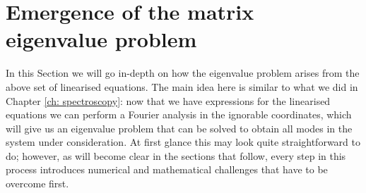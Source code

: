 \section{Emergence of the matrix eigenvalue problem} \label{sec: eigenvalue problem}
In this Section we will go in-depth on how the eigenvalue problem arises from the above set of linearised equations.
The main idea here is similar to what we did in Chapter \ref{ch: spectroscopy}: now that we have expressions for the linearised equations we can perform a Fourier analysis in the ignorable coordinates, which will give us an eigenvalue problem that can be solved to obtain all modes in the system under consideration. At first glance this may look quite straightforward to do; however, as will become clear in the sections that follow, every step in this process introduces numerical and mathematical challenges that have to be overcome first.

